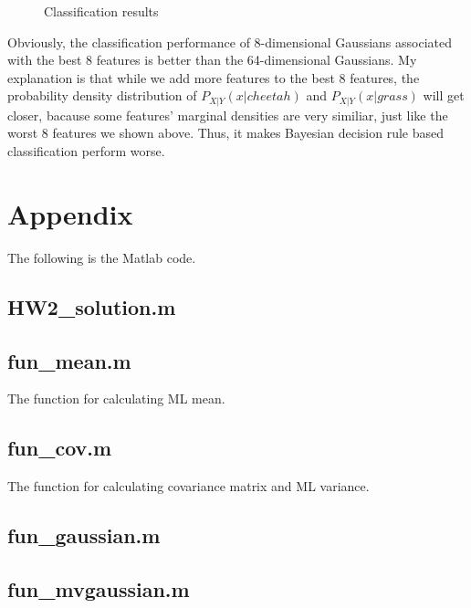 \documentclass[12pt,letterpaper]{article}
\begin{document}
\begin{enumerate}[a)]
\begin{figure}[H]
            \caption{Classification results}
            \label{Fig.main}
        \end{figure}
        Obviously, the classification performance of 8-dimensional Gaussians associated with the best 8 features is better than the 64-dimensional
        Gaussians. My explanation is that while we add more features to the best 8 features, the probability density distribution of
        $P_{X|Y}(x|cheetah)$ and $P_{X|Y}(x|grass)$ will get closer, bacause some features' marginal densities are very similiar, just like the worst
        8 features we shown above. Thus, it makes Bayesian decision rule based classification perform worse. 
    \end{enumerate}

    \section*{Appendix}
    The following is the Matlab code.

    \subsection{HW2\_solution.m}
    \lstset{style=mystyle}
    

    \subsection{fun\_mean.m}
    The function for calculating ML mean.
    \lstset{style=mystyle}
    

    \subsection{fun\_cov.m}
    The function for calculating covariance matrix and ML variance.
    \lstset{style=mystyle}
    

    \subsection{fun\_gaussian.m}
    \lstset{style=mystyle}
    

    \subsection{fun\_mvgaussian.m}
    \lstset{style=mystyle}
    

    
\end{document}
